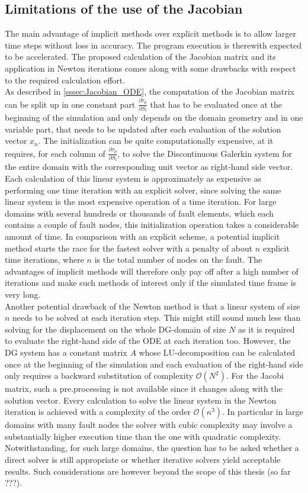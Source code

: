 \subsection{Limitations of the use of the Jacobian}
The main advantage of implicit methods over explicit methods is to allow larger time steps without loss in accuracy. The program execution is therewith expected to be accelerated. The proposed calculation of the Jacobian matrix and its application in Newton iterations comes along with some drawbacks with respect to the required calculation effort. \\
As described in \autoref{sssec:Jacobian_ODE}, the computation of the Jacobian matrix can be split up in one constant part $\frac{\partial \tau_p}{\partial S_l}$ that has to be evaluated once at the beginning of the simulation and only depends on the domain geometry and in one variable part, that needs to be updated after each evaluation of the solution vector $x_n$. The initialization can be quite computationally expensive, at it requires, for each column of $\frac{\partial \tau_p}{\partial S_l}$, to solve the Discontinuous Galerkin system for the entire domain with the corresponding unit vector as right-hand side vector. Each calculation of this linear system is approximately as expensive as performing one time iteration with an explicit solver, since solving the same linear system is the most expensive operation of a time iteration. For large domains with several hundreds or thousands of fault elements, which each contains a couple of fault nodes, this initialization operation takes a considerable amount of time. In comparison with an explicit scheme, a potential implicit method starts the race for the fastest solver with a penalty of about $n$ explicit time iterations, where $n$ is the total number of nodes on the fault. The advantages of implicit methods will therefore only pay off after a high number of iterations and make such methods of interest only if the simulated time frame is very long. \\
Another potential drawback of the Newton method is that a linear system of size $n$ needs to be solved at each iteration step. This might still sound much less than solving for the displacement on the whole DG-domain of size $N$ as it is required to evaluate the right-hand side of the ODE at each iteration too. However, the DG system has a constant matrix $A$ whose LU-decomposition can be calculated once at the beginning of the simulation and each evaluation of the right-hand side only requires a backward substitution of complexity $\mathcal{O}\left(N^2\right)$. For the Jacobi matrix, such a pre.processing is not available since it changes along with the solution vector. Every calculation to solve the linear system in the Newton iteration is achieved with a complexity of the order $\mathcal{O}\left(n^3\right)$. In particular in large domains with many fault nodes the solver with cubic complexity may involve a substantially higher execution time than the one with quadratic complexity. Notwithstanding, for such large domains, the question has to be asked whether a direct solver is still appropriate or whether iterative solvers yield acceptable results. Such considerations are however beyond the scope of this thesis (so far ???).

